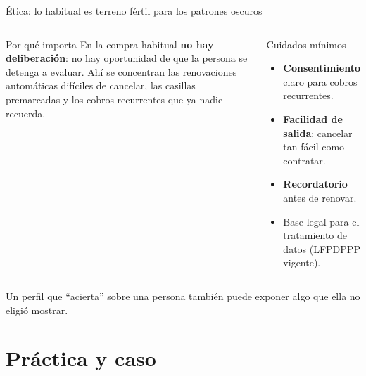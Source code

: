 \documentclass[aspectratio=169,xcolor=dvipsnames]{beamer}
\begin{document}
\begin{frame}{Ética: lo habitual es terreno fértil para los patrones oscuros}
\begin{columns}[T]
  \begin{alertblock}{Por qué importa}
    \small En la compra habitual \textbf{no hay deliberación}: no hay oportunidad de que la persona se detenga a evaluar. Ahí se concentran las renovaciones automáticas difíciles de cancelar, las casillas premarcadas y los cobros recurrentes que ya nadie recuerda.
  \end{alertblock}
  \begin{block}{Cuidados mínimos}
    \small
    \begin{itemize}
      \item \textbf{Consentimiento} claro para cobros recurrentes.
      \item \textbf{Facilidad de salida}: cancelar tan fácil como contratar.
      \item \textbf{Recordatorio} antes de renovar.
      \item Base legal para el tratamiento de datos (LFPDPPP vigente).
    \end{itemize}
  \end{block}
\end{columns}
\vspace{4pt}
{\small\color{IPNgris} Un perfil que \enquote{acierta} sobre una persona también puede exponer algo que ella no eligió mostrar.}
\end{frame}

\section[Práctica]{Práctica y caso}
\end{document}
